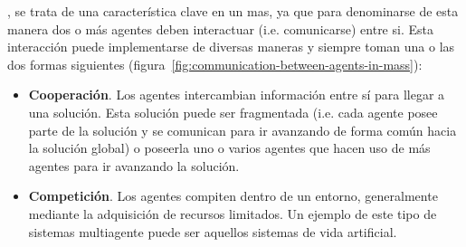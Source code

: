 , se trata de una característica clave en un \gls{mas}, ya que para denominarse de esta manera dos o más agentes deben interactuar (i.e. comunicarse) entre si. Esta interacción puede implementarse de diversas maneras y siempre toman una o las dos formas siguientes (figura~\ref{fig:communication-between-agents-in-mass}):

\begin{itemize}
	\item \textbf{Cooperación}. Los agentes intercambian información entre sí para llegar a una solución. Esta solución puede ser fragmentada (i.e. cada agente posee parte de la solución y se comunican para ir avanzando de forma común hacia la solución global) o poseerla uno o varios agentes que hacen uso de más agentes para ir avanzando la solución.
	\item \textbf{Competición}. Los agentes compiten dentro de un entorno, generalmente mediante la adquisición de recursos limitados. Un ejemplo de este tipo de sistemas multiagente puede ser aquellos sistemas de vida artificial.
\end{itemize}

